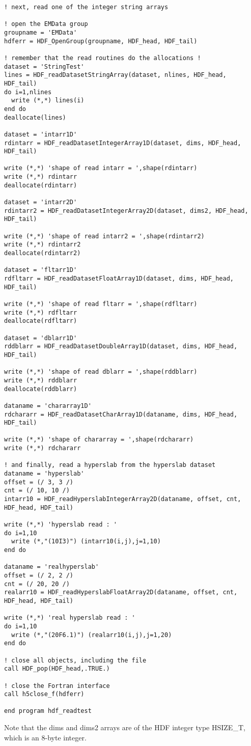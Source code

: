 \documentclass[DIV=calc, paper=letter, fontsize=11pt]{scrartcl}	 %
\begin{document}
{\begin{verbatim}
! next, read one of the integer string arrays

! open the EMData group
groupname = 'EMData'
hdferr = HDF_OpenGroup(groupname, HDF_head, HDF_tail)

! remember that the read routines do the allocations !
dataset = 'StringTest'
lines = HDF_readDatasetStringArray(dataset, nlines, HDF_head, HDF_tail)
do i=1,nlines
  write (*,*) lines(i)
end do
deallocate(lines)

dataset = 'intarr1D'
rdintarr = HDF_readDatasetIntegerArray1D(dataset, dims, HDF_head, HDF_tail)

write (*,*) 'shape of read intarr = ',shape(rdintarr)
write (*,*) rdintarr
deallocate(rdintarr)

dataset = 'intarr2D'
rdintarr2 = HDF_readDatasetIntegerArray2D(dataset, dims2, HDF_head, HDF_tail)

write (*,*) 'shape of read intarr2 = ',shape(rdintarr2)
write (*,*) rdintarr2
deallocate(rdintarr2)

dataset = 'fltarr1D'
rdfltarr = HDF_readDatasetFloatArray1D(dataset, dims, HDF_head, HDF_tail)

write (*,*) 'shape of read fltarr = ',shape(rdfltarr)
write (*,*) rdfltarr
deallocate(rdfltarr)

dataset = 'dblarr1D'
rddblarr = HDF_readDatasetDoubleArray1D(dataset, dims, HDF_head, HDF_tail)

write (*,*) 'shape of read dblarr = ',shape(rddblarr)
write (*,*) rddblarr
deallocate(rddblarr)

dataname = 'chararray1D'
rdchararr = HDF_readDatasetCharArray1D(dataname, dims, HDF_head, HDF_tail)

write (*,*) 'shape of chararray = ',shape(rdchararr)
write (*,*) rdchararr

! and finally, read a hyperslab from the hyperslab dataset
dataname = 'hyperslab'
offset = (/ 3, 3 /)
cnt = (/ 10, 10 /)
intarr10 = HDF_readHyperslabIntegerArray2D(dataname, offset, cnt, HDF_head, HDF_tail)

write (*,*) 'hyperslab read : '
do i=1,10
  write (*,"(10I3)") (intarr10(i,j),j=1,10)
end do

dataname = 'realhyperslab'
offset = (/ 2, 2 /)
cnt = (/ 20, 20 /)
realarr10 = HDF_readHyperslabFloatArray2D(dataname, offset, cnt, HDF_head, HDF_tail)

write (*,*) 'real hyperslab read : '
do i=1,10
  write (*,"(20F6.1)") (realarr10(i,j),j=1,20)
end do

! close all objects, including the file
call HDF_pop(HDF_head,.TRUE.)

! close the Fortran interface
call h5close_f(hdferr)

end program hdf_readtest
\end{verbatim}}
Note that the \textsf{dims} and \textsf{dims2} arrays are of the HDF integer type \textsf{HSIZE\_T}, which
is an 8-byte integer.
\end{document}
